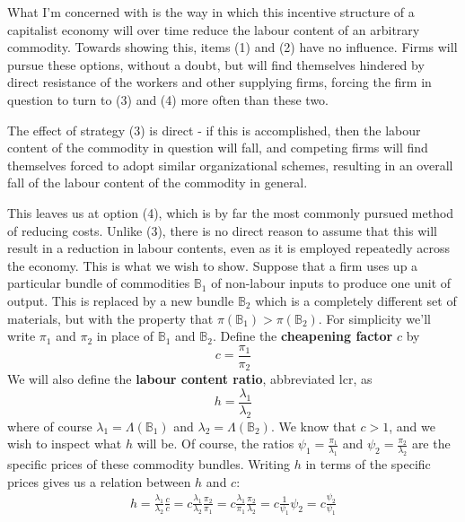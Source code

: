 \documentclass{article}
\theoremstyle{definition}
\theoremstyle{plain}
\theoremstyle{theorem}
\begin{document}
What I'm concerned with is the way in which this incentive structure of a capitalist economy will over time reduce the labour content of an arbitrary commodity. Towards showing this, items (1) and (2) have no influence. Firms will pursue these options, without a doubt, but will find themselves hindered by direct resistance of the workers and other supplying firms, forcing the firm in question to turn to (3) and (4) more often than these two. \par 
The effect of strategy (3) is direct - if this is accomplished, then the labour content of the commodity in question will fall, and competing firms will find themselves forced to adopt similar organizational schemes, resulting in an overall fall of the labour content of the commodity in general. \par 
This leaves us at option (4), which is by far the most commonly pursued method of reducing costs. Unlike (3), there is no direct reason to assume that this will result in a reduction in labour contents, even as it is employed repeatedly across the economy. This is what we wish to show. Suppose that a firm uses up a particular bundle of commodities $\mathbb{B}_1$ of non-labour inputs to produce one unit of output. This is replaced by a new bundle $\mathbb{B}_2$ which is a completely different set of materials, but with the property that $\pi(\mathbb{B}_1) > \pi(\mathbb{B}_2)$. For simplicity we'll write $\pi_1$ and $\pi_2$ in place of $\mathbb{B}_1$ and $\mathbb{B}_2$. Define the \textbf{cheapening factor} $c$ by
	\[ c = \frac{\pi_1}{\pi_2} \]
We will also define the \textbf{labour content ratio}, abbreviated lcr, as 
	\[ h = \frac{\lambda_1}{\lambda_2} \]
where of course $\lambda_1 = \Lambda(\mathbb{B}_1)$ and $\lambda_2 = \Lambda(\mathbb{B}_2)$. We know that $c > 1$, and we wish to inspect what $h$ will be. Of course, the ratios $\psi_1 = \frac{\pi_1}{\lambda_1}$ and $\psi_2 = \frac{\pi_2}{\lambda_2}$ are the specific prices of these commodity bundles. Writing $h$ in terms of the specific prices gives us a relation between $h$ and $c$:
\begin{align}
	h = \frac{\lambda_1}{\lambda_2} \frac{c}{c} = c \frac{\lambda_1}{\lambda_2} \frac{\pi_2}{\pi_1} = c \frac{\lambda_1}{\pi_1} \frac{\pi_2}{\lambda_2} = c \frac{1}{\psi_1} \psi_2 = c \frac{\psi_2}{\psi_1}
\end{align}
\end{document}
